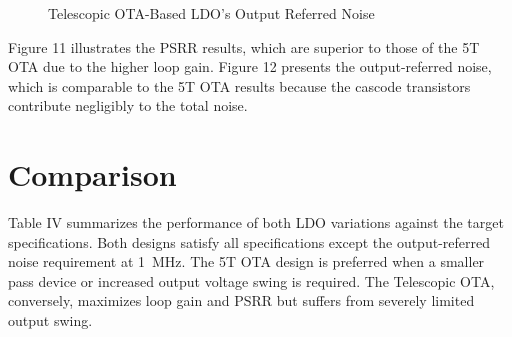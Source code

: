 \documentclass[journal]{IEEEtran}
\newcommand{\svg}[3]{
    \begin{figure}[!h]
        \centering
        
        \caption{#2}
    \end{figure}
}
\begin{document}
\svg{../simulations/images/tel_noise.svg}{Telescopic OTA-Based LDO's Output Referred Noise}{0.9}

Figure 11 illustrates the PSRR results, which are superior to those of the 5T OTA due to the higher loop gain. Figure 12 presents the output-referred noise, which is comparable to the 5T OTA results because the cascode transistors contribute negligibly to the total noise.

\section{Comparison}
Table IV summarizes the performance of both LDO variations against the target specifications. Both designs satisfy all specifications except the output-referred noise requirement at \qty{1}{\mega\hertz}. The 5T OTA design is preferred when a smaller pass device or increased output voltage swing is required. The Telescopic OTA, conversely, maximizes loop gain and PSRR but suffers from severely limited output swing.
\end{document}

